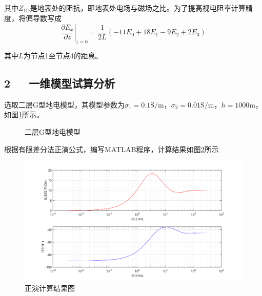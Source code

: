 \documentclass[12pt]{ctexart}
\begin{document}
    其中$Z_{\mathrm{1D}}$是地表处的阻抗，即地表处电场与磁场之比。为了提高视电阻率计算精度，将偏导数写成
    \begin{equation}
        \left.\dfrac{\partial E_x}{\partial z}\right|_{z=0}=\dfrac{1}{2L}(-11E_0+18E_1-9E_2+2E_3)\label{9}
    \end{equation}

    其中$L$为节点1至节点4的距离。
    \subsection*{2\ \ \ 一维模型试算分析}
    选取二层G型地电模型，其模型参数为$\sigma_1=0.1\mathrm{S/m}$，$\sigma_2=0.01\mathrm{S/m}$，$h=1000\mathrm{m}$，如图\ref{fig2}所示。
    \begin{figure}[H]
        \small
        \centering
        \caption{二层G型地电模型}\label{fig2}
    \end{figure}

    根据有限差分法正演公式，编写MATLAB程序，计算结果如图\ref{fig3}所示
    \begin{figure}[htbp]
        \small
        \centering
        \includegraphics[width=16cm]{Fig1.png}
        \caption{正演计算结果图} \label{fig3}
    \end{figure}
        
\end{document}
